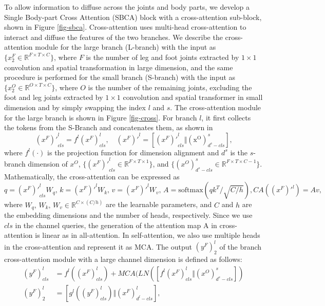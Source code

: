 \documentclass{bmvc2k}
\begin{document}
To allow information to diffuse across the joints and body parts, we develop a Single Body-part Cross Attention (SBCA) block with a cross-attention sub-block, shown in Figure \ref{fig-sbca}. Cross-attention uses multi-head cross-attention to interact and diffuse the features of the two branches. We describe the cross-attention module for the large branch (L-branch) with the input as $\{x^{F}_{2}\in\mathbb{R}^{F\times T\times C}\}$, where $F$ is the number of leg and foot joints extracted by $1\times1$ convolution and spatial transformation in large dimension, and the same procedure is performed for the small branch (S-branch) with the input as $\{x^{O}_{2}\in\mathbb{R}^{O\times T\times C}\}$, where $O$ is the number of the remaining joints, excluding the foot and leg joints extracted by $1\times1$ convolution and spatial transformer in small dimension and by simply swapping the index $l$ and $s$. The cross-attention module for the large branch is shown in Figure \ref{fig-cross}. For branch $l$, it first collects the tokens from the S-Branch and concatenates them, as shown in
\begin{equation}
{(x^{F})'}^{l}_{cls}=f^{l}(x^{F})^{l}_{cls},\quad
{(x^{F})'}^{l}=[{(x^{F})'}^{l}_{cls}\Vert \mathrm{(x^{O})}^{s}_{d^{s} - cls}] \text{,}
\end{equation}
where $f^{l}(\cdot)$ is the projection function for dimension alignment and $d^{s}$ is the $s$-branch dimension of $x^{O}$, $\{{(x^{F})'}^{l}_{cls}\in\mathbb{R}^{F\times T\times 1}\}$, and $\{{(x^{O})}^{s}_{d^{s}-cls}\in\mathbb{R}^{F\times T\times C-1}\}$.
Mathematically, the cross-attention can be expressed as
\begin{equation}
q={(x^{F})'}^{l}_{cls}W_{q},\,k={(x^{F})'}^{l}W_{k},\,v={(x^{F})'}^{l}W_{v},\,
A=\mathrm{softmax}(qk^{T}/\sqrt{C/h}),CA((x^{F})'^{l})=Av \text{,}
\end{equation}
where $W_{q},\, W_{k},\, W_{v}\in \mathbb{R}^{C\times(C/h)}$ are the learnable parameters, and $C$ and $h$ are the embedding dimensions and the number of heads, respectively.
Since we use $cls$ in the channel queries, the generation of the attention map A in cross-attention is linear as in all-attention. In self-attention, we also use multiple heads in the cross-attention and represent it as MCA. The output $(y^{F})^{l}_{2}$ of the branch cross-attention module with a large channel dimension is defined as follows:
\begin{align}
(y^{F})^{l}_{cls}&=f^{l}((x^{F})^{l}_{cls})+\mathit{MCA}(\mathit{LN}([f^{l}{(x^{F})}^{l}_{cls}\Vert (x^{O})^{s}_{d^{s} - cls}]) \\
(y^{F})^{l}_{2}&=[g^{l}((y^{F})^{l}_{cls})\Vert (x^{F})^{l}_{d^{l} - cls}] \text{,}
\end{align}
\end{document}
